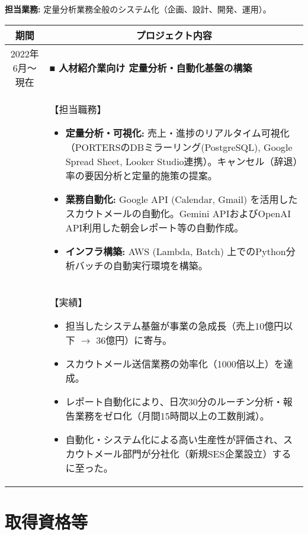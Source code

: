 \documentclass[uplatex,a4j,10.5pt,dvipdfmx]{jsarticle}
\begin{document}
\noindent\textbf{担当業務:} 定量分析業務全般のシステム化（企画、設計、開発、運用）。
\begin{longtable}{|c|p{14cm}|}
	\hline
	\multicolumn{1}{|c|}{\textbf{期間}} & \multicolumn{1}{c|}{\textbf{プロジェクト内容}} \\
	\hline
	\endhead
	\hline
	2022年6月～現在                        & \textbf{■ 人材紹介業向け 定量分析・自動化基盤の構築}       \\
	                                  & 【担当職務】
	\begin{itemize}[leftmargin=*,noitemsep]
		\item \textbf{定量分析・可視化:} 売上・進捗のリアルタイム可視化（PORTERSのDBミラーリング(PostgreSQL), Google Spread Sheet, Looker Studio連携）。キャンセル（辞退）率の要因分析と定量的施策の提案。
		\item \textbf{業務自動化:} Google API (Calendar, Gmail) を活用したスカウトメールの自動化。Gemini APIおよびOpenAI API利用した朝会レポート等の自動作成。
		\item \textbf{インフラ構築:} AWS (Lambda, Batch) 上でのPython分析バッチの自動実行環境を構築。
	\end{itemize}
	\\
	                                  & 【実績】
	\begin{itemize}[leftmargin=*,noitemsep]
		\item 担当したシステム基盤が事業の急成長（売上10億円以下 $\to$ 36億円）に寄与。
		\item スカウトメール送信業務の効率化（1000倍以上）を達成。
		\item レポート自動化により、日次30分のルーチン分析・報告業務をゼロ化（月間15時間以上の工数削減）。
		\item 自動化・システム化による高い生産性が評価され、スカウトメール部門が分社化（新規SES企業設立）するに至った。
	\end{itemize}
	\\
	\hline
\end{longtable}





\section{取得資格等}
\end{document}
